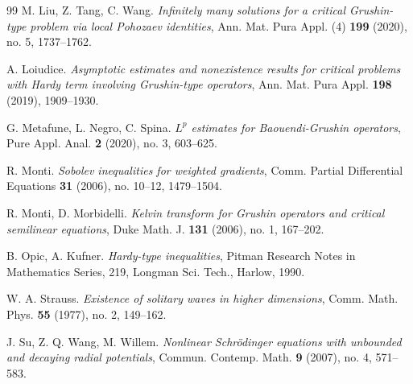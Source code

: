 \documentclass[12pt]{amsart}
\begin{document}
\begin{thebibliography}{99}
M. Liu, Z. Tang, C. Wang.
\textit{Infinitely many solutions for a critical Grushin-type problem via local Pohozaev identities},
Ann. Mat. Pura Appl. (4) {\bf 199} (2020), no. 5, 1737--1762.

A. Loiudice.
\textit{Asymptotic estimates and nonexistence results for critical problems with Hardy term involving Grushin-type operators},
Ann. Mat. Pura Appl. {\bf 198} (2019), 1909--1930.

G. Metafune, L. Negro, C. Spina.
\textit{$L^p$ estimates for Baouendi-Grushin operators},
Pure Appl. Anal. {\bf 2} (2020), no. 3, 603--625.

R. Monti.
\textit{Sobolev inequalities for weighted gradients},
Comm. Partial Differential Equations {\bf 31} (2006), no. 10--12, 1479--1504.

R. Monti, D. Morbidelli.
\textit{Kelvin transform for Grushin operators and critical semilinear equations},
Duke Math. J. {\bf 131} (2006), no. 1, 167--202.

B. Opic, A. Kufner.
\textit{Hardy-type inequalities},
Pitman Research Notes in Mathematics Series, 219, Longman Sci. Tech., Harlow, 1990.

W. A. Strauss.
\textit{Existence of solitary waves in higher dimensions},
Comm. Math. Phys. {\bf 55} (1977), no. 2, 149--162.

J. Su, Z. Q. Wang, M. Willem.
\textit{Nonlinear Schr\"odinger equations with unbounded and decaying radial potentials},
Commun. Contemp. Math. {\bf 9} (2007), no. 4, 571--583.

    
	
\end{thebibliography}
	
\end{document}
